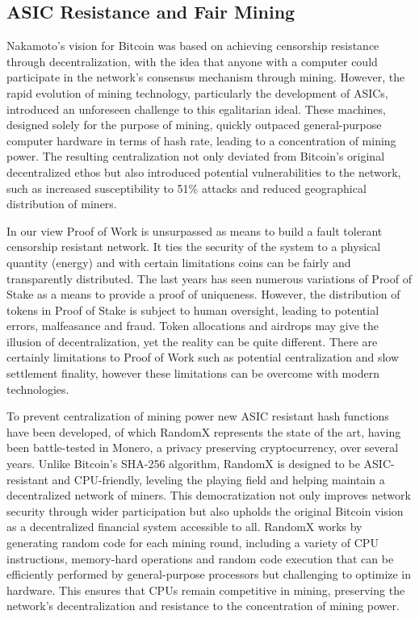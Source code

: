 \documentclass{article}
\begin{document}
\subsection*{ASIC Resistance and Fair Mining}

Nakamoto's vision for Bitcoin was based on achieving censorship resistance through decentralization, with the idea that anyone with a computer could participate in the network's consensus mechanism through mining. However, the rapid evolution of mining technology, particularly the development of ASICs, introduced an unforeseen challenge to this egalitarian ideal. These machines, designed solely for the purpose of mining, quickly outpaced general-purpose computer hardware in terms of hash rate, leading to a concentration of mining power. The resulting centralization not only deviated from Bitcoin's original decentralized ethos but also introduced potential vulnerabilities to the network, such as increased susceptibility to 51\% attacks and reduced geographical distribution of miners. 

\vspace{2mm}

In our view Proof of Work is unsurpassed as means to build a fault tolerant censorship resistant network. It ties the security of the system to a physical quantity (energy) and with certain limitations coins can be fairly and transparently distributed. The last years has seen numerous variations of Proof of Stake as a means to provide a proof of uniqueness. However, the distribution of tokens in Proof of Stake is subject to human oversight, leading to potential errors, malfeasance and fraud. Token allocations and airdrops may give the illusion of decentralization, yet the reality can be quite different. There are certainly limitations to Proof of Work such as potential centralization and slow settlement finality, however these limitations can be overcome with modern technologies. 

\vspace{2mm}

To prevent centralization of mining power new ASIC resistant hash functions have been developed, of which RandomX represents the state of the art, having been battle-tested in Monero, a privacy preserving cryptocurrency, over several years. Unlike Bitcoin's SHA-256 algorithm, RandomX is designed to be ASIC-resistant and CPU-friendly, leveling the playing field and helping maintain a decentralized network of miners. This democratization not only improves network security through wider participation but also upholds the original Bitcoin vision as a decentralized financial system accessible to all. RandomX works by generating random code for each mining round, including a variety of CPU instructions, memory-hard operations and random code execution that can be efficiently performed by general-purpose processors but challenging to optimize in hardware. This ensures that CPUs remain competitive in mining, preserving the network's decentralization and resistance to the concentration of mining power.
\end{document}
